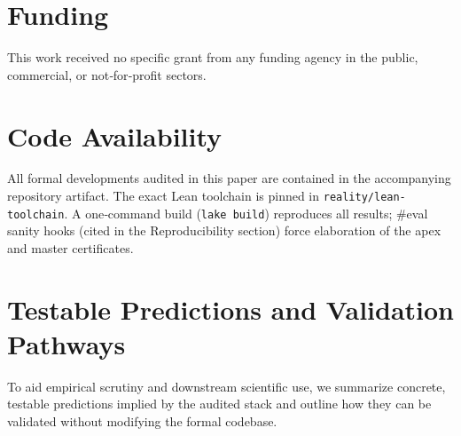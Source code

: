\documentclass{article}
\begin{document}
\section{Funding}
This work received no specific grant from any funding agency in the public, commercial, or not‑for‑profit sectors.

\section{Code Availability}
All formal developments audited in this paper are contained in the accompanying repository artifact. The exact Lean toolchain is pinned in \texttt{reality/lean-toolchain}. A one‑command build (\texttt{lake build}) reproduces all results; #eval sanity hooks (cited in the Reproducibility section) force elaboration of the apex and master certificates.

\section{Testable Predictions and Validation Pathways}
To aid empirical scrutiny and downstream scientific use, we summarize concrete, testable predictions implied by the audited stack and outline how they can be validated without modifying the formal codebase.
\end{document}
